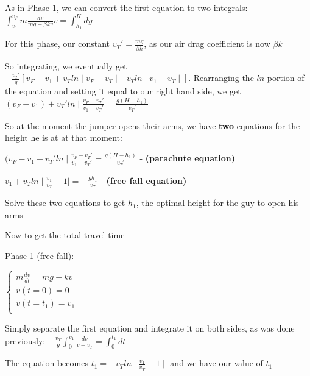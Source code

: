 \documentclass{article}
\begin{document}
\noindent As in Phase 1, we can convert the first equation to two integrals: $\int_{v_{1}}^{v_{F}} m \frac{dv}{mg - \beta kv}v = \int_{h_{1}}^{H} dy$ \par\vspace{0.25cm}

\noindent For this phase, our constant $v_{T}' = \frac{mg}{\beta k}$, as our air drag coefficient is now $\beta k$ \par\vspace{0.25cm}

\noindent So integrating, we eventually get $-\frac{v_{T}'}{g}[v_{F} - v_{1} + v_{T}ln \mid v_{F} - v_{T} \mid - v_{T}ln \mid v_{1} - v_{T} \mid ]$.  Rearranging the $ln$ portion of the equation and setting it equal to our right hand side, we get $(v_{F} - v_{1}) + v_{T}' ln \mid \frac{v_{F} - v_{T}'}{v_{1} - v_{T}'} = \frac{g(H - h_{1})}{v_{T}'}$ \par\vspace{0.25cm}

\noindent So at the moment the jumper opens their arms, we have \textbf{two} equations for the height he is at at that moment: \par
\noindent $(v_{F} - v_{1} + v_{T}' ln \mid \frac{v_{F} - v_{T}'}{v_{1} - v_{T}'} = \frac{g(H - h_{1})}{v_{T}'}$ - \textbf{(parachute equation)} \par
\noindent $v_{1} + v_{T} ln \mid \frac{v_{1}}{v_{T}} - 1 \mid = -\frac{gh_{1}}{v_{T}}$ - \textbf{(free fall equation)} \par
\noindent Solve these two equations to get $h_{1}$, the optimal height for the guy to open his arms \par\vspace{0.25cm}

\noindent Now to get the total travel time \par\vspace{0.25cm}

\noindent Phase 1 (free fall):

$\begin{cases}
    m\frac{dv}{dt} = mg - kv \\
    v(t = 0) = 0 \\
    v(t = t_{1}) = v_{1} \\
    \end{cases}$
    
\par\vspace{0.25cm}

\noindent Simply separate the first equation and integrate it on both sides, as was done previously: $-\frac{v_{T}}{g} \int_{0}^{v_{1}} \frac{dv}{v - v_{T}} = \int_{0}^{t_{1}} dt$ \par
\noindent The equation becomes $t_{1} = -v_{T} ln \mid \frac{v_{1}}{v_{T}} - 1 \mid$ and we have our value of $t_{1}$ \par\vspace{0.25cm}
\end{document}
